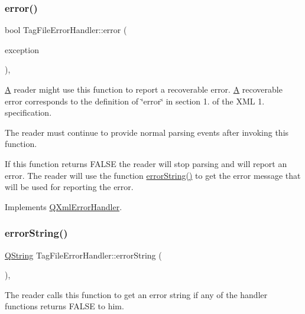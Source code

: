 \subsubsection{\texorpdfstring{error()}{error()}}
{\footnotesize\ttfamily bool Tag\+File\+Error\+Handler\+::error (\begin{DoxyParamCaption}\item[{const \mbox{\hyperlink{class_q_xml_parse_exception}{Q\+Xml\+Parse\+Exception}} \&}]{exception }\end{DoxyParamCaption})\hspace{0.3cm}{\ttfamily [inline]}, {\ttfamily [virtual]}}

\mbox{\hyperlink{class_a}{A}} reader might use this function to report a recoverable error. \mbox{\hyperlink{class_a}{A}} recoverable error corresponds to the definition of \char`\"{}error\char`\"{} in section 1. of the X\+ML 1. specification.

The reader must continue to provide normal parsing events after invoking this function.

If this function returns F\+A\+L\+SE the reader will stop parsing and will report an error. The reader will use the function \mbox{\hyperlink{class_tag_file_error_handler_a699ed3bca495674a04d051a6a7a0b96d}{error\+String()}} to get the error message that will be used for reporting the error. 

Implements \mbox{\hyperlink{class_q_xml_error_handler_aa7e25c4198fa16a0312fd48e5718217c}{Q\+Xml\+Error\+Handler}}.

\mbox{\label{class_tag_file_error_handler_a699ed3bca495674a04d051a6a7a0b96d}} 
\subsubsection{\texorpdfstring{errorString()}{errorString()}}
{\footnotesize\ttfamily \mbox{\hyperlink{class_q_string}{Q\+String}} Tag\+File\+Error\+Handler\+::error\+String (\begin{DoxyParamCaption}{ }\end{DoxyParamCaption})\hspace{0.3cm}{\ttfamily [inline]}, {\ttfamily [virtual]}}

The reader calls this function to get an error string if any of the handler functions returns F\+A\+L\+SE to him. 

